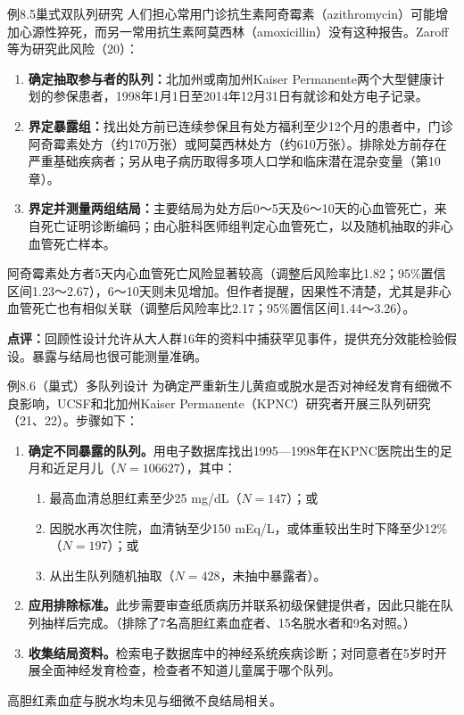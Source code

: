 \begin{bookbox}{例8.5\quad 巢式双队列研究}
人们担心常用门诊抗生素阿奇霉素（azithromycin）可能增加心源性猝死，而另一常用抗生素阿莫西林（amoxicillin）没有这种报告。Zaroff等为研究此风险（20）：
\begin{enumerate}
\item \textbf{确定抽取参与者的队列：}北加州或南加州Kaiser Permanente两个大型健康计划的参保患者，1998年1月1日至2014年12月31日有就诊和处方电子记录。
\item \textbf{界定暴露组：}找出处方前已连续参保且有处方福利至少12个月的患者中，门诊阿奇霉素处方（约170万张）或阿莫西林处方（约610万张）。排除处方前存在严重基础疾病者；另从电子病历取得多项人口学和临床潜在混杂变量（第10章）。
\item \textbf{界定并测量两组结局：}主要结局为处方后0～5天及6～10天的心血管死亡，来自死亡证明诊断编码；由心脏科医师组判定心血管死亡，以及随机抽取的非心血管死亡样本。
\end{enumerate}
阿奇霉素处方者5天内心血管死亡风险显著较高（调整后风险率比1.82；95\%置信区间1.23～2.67），6～10天则未见增加。但作者提醒，因果性不清楚，尤其是非心血管死亡也有相似关联（调整后风险率比2.17；95\%置信区间1.44～3.26）。

\textbf{点评：}回顾性设计允许从大人群16年的资料中捕获罕见事件，提供充分效能检验假设。暴露与结局也很可能测量准确。
\end{bookbox}

\begin{bookbox}{例8.6\quad （巢式）多队列设计}
为确定严重新生儿黄疸或脱水是否对神经发育有细微不良影响，UCSF和北加州Kaiser Permanente（KPNC）研究者开展三队列研究（21、22）。步骤如下：
\begin{enumerate}
\item \textbf{确定不同暴露的队列。}用电子数据库找出1995—1998年在KPNC医院出生的足月和近足月儿（$N=106627$），其中：
\begin{enumerate}
\item 最高血清总胆红素至少25 mg/dL（$N=147$）；或
\item 因脱水再次住院，血清钠至少150 mEq/L，或体重较出生时下降至少12\%（$N=197$）；或
\item 从出生队列随机抽取（$N=428$，未抽中暴露者）。
\end{enumerate}
\item \textbf{应用排除标准。}此步需要审查纸质病历并联系初级保健提供者，因此只能在队列抽样后完成。（排除了7名高胆红素血症者、15名脱水者和9名对照。）
\item \textbf{收集结局资料。}检索电子数据库中的神经系统疾病诊断；对同意者在5岁时开展全面神经发育检查，检查者不知道儿童属于哪个队列。
\end{enumerate}
高胆红素血症与脱水均未见与细微不良结局相关。
\end{bookbox}

